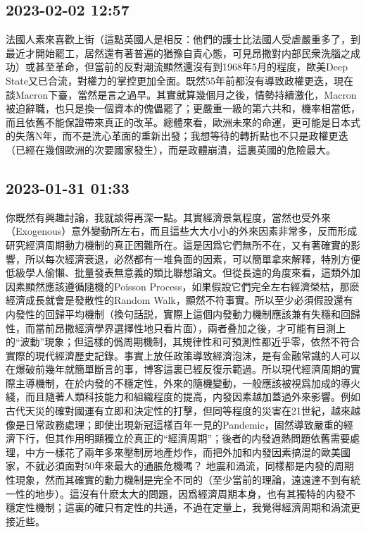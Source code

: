 \documentclass[twocolumn]{ctexart}
\begin{document}
\subsection*{2023-02-02 12:57}

法國人素來喜歡上街（這點英國人是相反：他們的護士比法國人受虐嚴重多了，到最近才開始罷工，居然還有著普遍的猶豫自責心態，可見昂撒對内部民衆洗腦之成功）或甚至革命，但當前的反對潮流顯然還沒有到1968年5月的程度，歐美Deep State又已合流，對權力的掌控更加全面。既然55年前都沒有導致政權更迭，現在談Macron下臺，當然是言之過早。其實就算幾個月之後，情勢持續激化，Macron被迫辭職，也只是換一個資本的傀儡罷了；更嚴重一級的第六共和，機率相當低，而且依舊不能保證帶來真正的改革。總體來看，歐洲未來的命運，更可能是日本式的失落N年，而不是洗心革面的重新出發；我想等待的轉折點也不只是政權更迭（已經在幾個歐洲的次要國家發生），而是政體崩潰，這裏英國的危險最大。
\subsection*{2023-01-31 01:33}

你既然有興趣討論，我就談得再深一點。其實經濟景氣程度，當然也受外來（Exogenous）意外變動所左右，而且這些大大小小的外來因素非常多，反而形成研究經濟周期動力機制的真正困難所在。這是因爲它們無所不在，又有著確實的影響，所以每次經濟衰退，必然都有一堆負面的因素，可以簡單拿來解釋，特別方便低級學人偷懶、批量發表無意義的類比聯想論文。但從長遠的角度來看，這類外加因素顯然應該遵循隨機的Poisson Process，如果假設它們完全左右經濟榮枯，那麽經濟成長就會是發散性的Random Walk，顯然不符事實。所以至少必須假設還有内發性的回歸平均機制（換句話説，實際上這個内發動力機制應該兼有失穩和回歸性，而當前昂撒經濟學界選擇性地只看片面），兩者叠加之後，才可能有目測上的“波動”現象；但這樣的僞周期機制，其規律性和可預測性都近乎零，依然不符合實際的現代經濟歷史記錄。事實上放任政策導致經濟泡沫，是有金融常識的人可以在爆破前幾年就簡單斷言的事，博客這裏已經反復示範過。所以現代經濟周期的實際主導機制，在於内發的不穩定性，外來的隨機變動，一般應該被視爲加成的導火綫，而且隨著人類科技能力和組織程度的提高，内發因素越加蓋過外來影響。例如古代天災的確對國運有立即和決定性的打擊，但同等程度的災害在21世紀，越來越像是日常政務處理；即使出現新冠這樣百年一見的Pandemic，固然導致嚴重的經濟下行，但其作用明顯獨立於真正的“經濟周期”；後者的内發過熱問題依舊需要處理，中方一樣花了兩年多來壓制房地產炒作，而把外加和内發因素搞混的歐美國家，不就必須面對50年來最大的通脹危機嗎？
地震和渦流，同樣都是内發的周期性現象，然而其確實的動力機制是完全不同的（至少當前的理論，遠遠達不到有統一性的地步）。這沒有什麽太大的問題，因爲經濟周期本身，也有其獨特的内發不穩定性機制；這裏的確只有定性的共通，不過在定量上，我覺得經濟周期和渦流更接近些。
\end{document}
